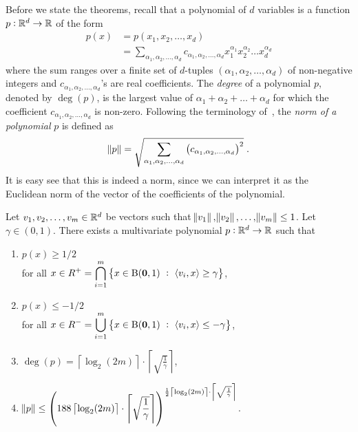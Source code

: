 Before we state the theorems, recall that a polynomial of $d$ variables is a
function $p:\mathbb{R}^d \to \mathbb{R}$ of the form
\begin{align*}
p(x)
& = p(x_1, x_2, \dots, x_d) \\
& = \sum_{\alpha_1, \alpha_2, \dots, \alpha_d} c_{\alpha_1, \alpha_2, \dots, \alpha_d} x_1^{\alpha_1} x_2^{\alpha_2} \dots x_d^{\alpha_d}
\end{align*}
where the sum ranges over a finite set of $d$-tuples $(\alpha_1, \alpha_2,
\dots, \alpha_d)$ of non-negative integers and $c_{\alpha_1, \alpha_2, \dots,
\alpha_d}$'s are real coefficients. The \emph{degree} of a polynomial $p$,
denoted by $\deg(p)$, is the largest value of $\alpha_1 + \alpha_2 + \dots +
\alpha_d$ for which the coefficient $c_{\alpha_1, \alpha_2, \dots, \alpha_d}$ is
non-zero. Following the terminology of~\citet{Klivans-Servedio-2008}, the
\emph{norm of a polynomial} $p$ is defined as
$$
\norm{p} = \sqrt{\sum_{\alpha_1, \alpha_2, \dots, \alpha_d} \left(c_{\alpha_1, \alpha_2, \dots, \alpha_d} \right)^2 } \; .
$$
It is easy see that this is indeed a norm, since we can interpret it as the
Euclidean norm of the vector of the coefficients of the polynomial.

\begin{theorem}
\label{theorem:polynomial-approximation-1}
Let $v_1, v_2, \dots, v_m \in \mathbb{R}^d$ be vectors such that $\norm{v_1},
\norm{v_2}, \dots, \norm{v_m} \le 1$. Let $\gamma \in (0,1)$. There exists a
multivariate polynomial $p:\mathbb{R}^d \to \mathbb{R}$ such that
\begin{enumerate}
\item $p(x) \ge 1/2$ \\ for all $\displaystyle x \in R^+ = \bigcap_{i=1}^m \left\{ x \in \operatorname{B}(\mathbf{0},1) ~:~  \left\langle v_i, x \right\rangle \ge \gamma \right\}$,
\item $p(x) \le -1/2$ \\ for all $\displaystyle x \in R^- = \bigcup_{i=1}^m \left\{ x \in \operatorname{B}(\mathbf{0},1) ~:~  \left\langle v_i, x \right\rangle \le - \gamma \right\}$,
\item $\displaystyle \deg(p) = \left\lceil \log_2(2m) \right\rceil \cdot \left\lceil \sqrt{\frac{1}{\gamma}} \right\rceil$,
\item $\displaystyle \norm{p} \le \left( 188 \left\lceil \log_2(2m) \right\rceil \cdot \left\lceil \sqrt{\frac{1}{\gamma}} \right\rceil \right)^{\frac{1}{2} \left\lceil \log_2(2m) \right\rceil \cdot \left\lceil \sqrt{\frac{1}{\gamma}} \right\rceil}$.
\end{enumerate}
\end{theorem}

